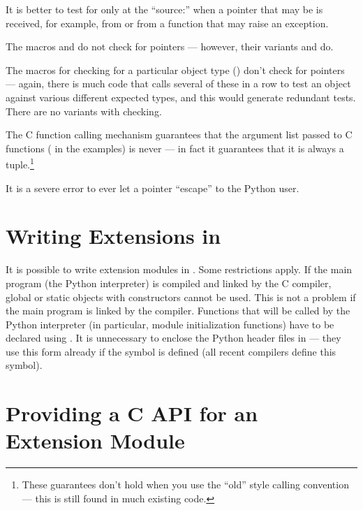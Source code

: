 It is better to test for \NULL{} only at the ``source:'' when a
pointer that may be \NULL{} is received, for example, from
 or from a function that may raise an exception.

The macros  and 
do not check for \NULL{} pointers --- however, their variants
 and  do.

The macros for checking for a particular object type
() don't check for \NULL{} pointers ---
again, there is much code that calls several of these in a row to test
an object against various different expected types, and this would
generate redundant tests.  There are no variants with \NULL{}
checking.

The C function calling mechanism guarantees that the argument list
passed to C functions ( in the examples) is never
\NULL{} --- in fact it guarantees that it is always a tuple.\footnote{
These guarantees don't hold when you use the ``old'' style
calling convention --- this is still found in much existing code.}

It is a severe error to ever let a \NULL{} pointer ``escape'' to
the Python user.



\section{Writing Extensions in \Cpp
         \label{cplusplus}}

It is possible to write extension modules in \Cpp.  Some restrictions
apply.  If the main program (the Python interpreter) is compiled and
linked by the C compiler, global or static objects with constructors
cannot be used.  This is not a problem if the main program is linked
by the \Cpp{} compiler.  Functions that will be called by the
Python interpreter (in particular, module initialization functions)
have to be declared using .
It is unnecessary to enclose the Python header files in
 --- they use this form already if the symbol
 is defined (all recent \Cpp{} compilers define this
symbol).


\section{Providing a C API for an Extension Module
         \label{using-cobjects}}

